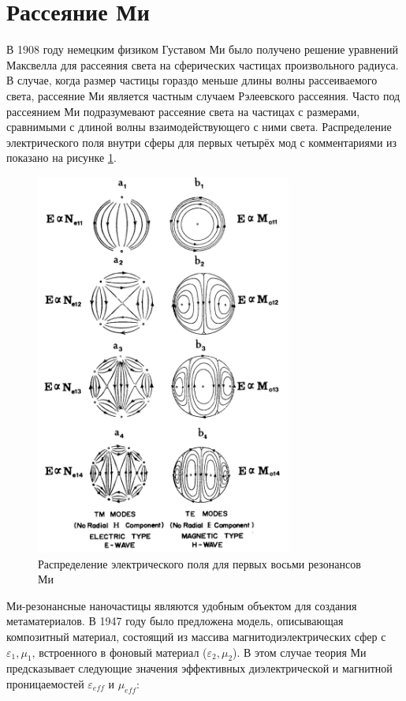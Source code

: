 \section{Рассеяние Ми}

В 1908 году немецким физиком Густавом Ми было получено \cite{Mie1908} решение уравнений Максвелла для рассеяния света на сферических частицах произвольного радиуса. В случае, когда размер частицы гораздо меньше длины волны рассеиваемого света, рассеяние Ми является частным случаем Рэлеевского рассеяния. Часто под рассеянием Ми подразумевают рассеяние света на частицах с размерами, сравнимыми с длиной волны взаимодействующего с ними света. Распределение электрического поля внутри сферы для первых четырёх мод с комментариями из \cite{Bohren1998} показано на рисунке \ref{fig:mie_example}.

\begin{figure}[H]
	\centering
	\includegraphics[width=0.75\textwidth]{img/Mie_total}
	\caption{Распределение электрического поля для первых восьми резонансов Ми}
	\label{fig:mie_example}
\end{figure}

Ми-резонансные наночастицы являются удобным объектом для создания метаматериалов. В 1947 году было предложена \cite{Lewin1947} модель, описывающая композитный материал, состоящий из массива магнитодиэлектрических сфер с $\varepsilon_1, \mu_1$, встроенного в фоновый материал ($\varepsilon_2, \mu_2$). В этом случае теория Ми предсказывает следующие значения эффективных диэлектрической и магнитной проницаемостей $\varepsilon_{eff}$ и $\mu_{eff}$:

